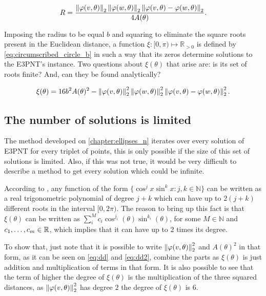 \begin{equation}\label{eq:circumscribed_circle}
R = \dfrac{\left\lVert\varphi(v, \theta)\right\rVert_{2}\left\lVert\varphi(w, \theta)\right\rVert_{2}\left\lVert\varphi(v, \theta)-\varphi(w, \theta)\right\rVert_{2}   }{4A(\theta)}.
\end{equation}

Imposing the radius to be equal $b$ and squaring to eliminate the square roots present in the Euclidean distance, a function $\xi : [0, \pi) \mapsto \mathbb{R}_{>0}$ is defined by \autoref{eq:circumscribed_circle_b} in such a way that its zeros determine solutions to the E3PNT's instance. Two questions about $\xi(\theta)$ that arise are: is its set of roots finite? And, can they be found analytically?

\begin{equation}\label{eq:circumscribed_circle_b}
\xi(\theta) = 16b^2A(\theta)^2 - \left\lVert\varphi(v, \theta)\right\rVert_{2}^2\left\lVert\varphi(w, \theta)\right\rVert_{2}^2\left\lVert\varphi(v, \theta)-\varphi(w, \theta)\right\rVert_{2}^2.
\end{equation}

\subsection{The number of solutions is limited}

The method developed on \autoref{chapter:ellipses_n} iterates over every solution of E3PNT for every triplet of points, this is only possible if the size of this set of solutions is limited. Also, if this was not true, it would be very difficult to describe a method to get every solution which could be infinite.

According to , any function of the form $\{\cos^j{x}\sin^k{x} : j, k \in \mathbb{N}\}$ can be written as a real trigonometric polynomial of degree $j+k$ which can have up to $2(j+k)$ different roots in the interval $[0, 2\pi)$. The reason to bring up this fact is that $\xi(\theta)$ can be written as $\sum_i^M c_i \cos^{j_i}(\theta)\sin^{k_i}(\theta)$, for some $M \in \mathbb{N}$ and $c_1, \dots, c_m \in \mathbb{R}$, which implies that it can have up to $2$ times its degree.

 To show that, just note that it is possible to write $\left\lVert\varphi(v, \theta)\right\rVert_{2}^2$ and $A(\theta)^2$ in that form, as it can be seen on \autoref{eq:dd} and \autoref{eq:dd2}, combine the parts as $\xi(\theta)$ is just addition and multiplication of terms in that form. It is also possible to see that the term of higher the degree of $\xi(\theta)$ is the multiplication of the three squared distances, as $\left\lVert\varphi(v, \theta)\right\rVert_{2}^2$ has degree $2$ the degree of $\xi(\theta)$ is $6$.


